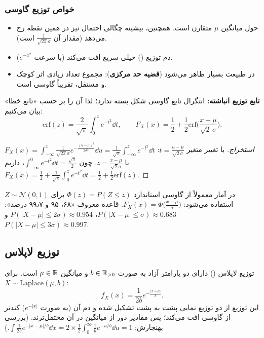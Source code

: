 \subsubsection*{خواص توزیع گاوسی}
\begin{itemize}
\item حول میانگین $\mu$ متقارن است. همچنین، بیشینه چگالی احتمال نیز در همین نقطه رخ می‌دهد (مقدار آن $\frac1{\sqrt{2\pi}\sigma}$ است).
\item دم توزیع () خیلی سریع افت می‌کند (با سرعت $e^{-x^2}$).
\item در طبیعت بسیار ظاهر می‌شود (\textbf{قضیه حد مرکزی}): مجموع تعداد زیادی اثر کوچک و مستقل، تقریباً گاوسی است.
\end{itemize}

\textbf{تابع توزیع انباشته:} انتگرال تابع گاوسی شکل بسته ندارد؛ لذا آن را بر حسب «تابع خطا» بیان می‌کنیم:
\[
\mathrm{erf}(z)=\frac{2}{\sqrt\pi}\int_0^ze^{-t^2}\dd t,\qquad
F_X(x)=\frac12+\frac12\mathrm{erf}\Big(\frac{x-\mu}{\sqrt2\,\sigma}\Big).
\]
\begin{proof}[استخراج]
با تغییر متغیر $t=\frac{u-\mu}{\sqrt2\sigma}$:
$F_X(x)=\int_{-\infty}^x\frac{1}{\sqrt{2\pi}\sigma}e^{-\frac{(u-\mu)^2}{2\sigma^2}}\dd u=\frac{1}{\sqrt\pi}\int_{-\infty}^{z}e^{-t^2}\dd t$ با $z=\frac{x-\mu}{\sqrt2\sigma}$. چون $\int_{-\infty}^0e^{-t^2}\dd t=\frac{\sqrt\pi}{2}$، داریم $F_X(x)=\frac12+\frac1{\sqrt\pi}\int_0^ze^{-t^2}\dd t=\frac12+\frac12\mathrm{erf}(z)$.
\end{proof}

\begin{note}
\notetitle در آمار معمولاً از  گاوسی استاندارد $\Phi(z)=P(Z\le z)$ برای $Z\sim\mathcal N(0,1)$ استفاده می‌شود: $F_X(x)=\Phi\big(\frac{x-\mu}{\sigma}\big)$. قاعده معروف «۶۸، ۹۵ و ۹۹٫۷ درصد»:
$P(|X-\mu|\le\sigma)\approx0.683$، $P(|X-\mu|\le2\sigma)\approx0.954$ و $P(|X-\mu|\le3\sigma)\approx0.997$.
\end{note}

\subsection{توزیع لاپلاس }
توزیع لاپلاس () دارای دو پارامتر آزاد به صورت $b\in\mathbb{R}_{>0}$ و میانگین $\mu\in\mathbb{R}$ است. برای $X\sim\mathrm{Laplace}(\mu,b)$:
\[
f_X(x)=\frac{1}{2b}e^{-\frac{|x-\mu|}{b}} .
\]
این توزیع از دو توزیع نمایی پشت به پشت تشکیل شده و دم آن (به صورت $e^{-|x|}$) کندتر از گاوسی افت می‌کند؛ پس مقادیر دور از میانگین در آن محتمل‌ترند. (بررسی بهنجارش: $\int\frac1{2b}e^{-|x-\mu|/b}\dd x=2\times\frac12\int_0^\infty\frac1be^{-u/b}\dd u=1$.)

